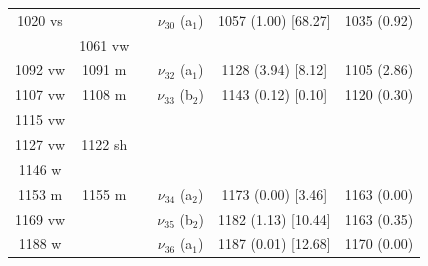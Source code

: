 \begin{table}[H]
\begin{center}
\begin{tabular}{c c c c c c}
 1020 vs &  &  & $\nu_{30}$ (a$_{1}$) & 1057 (1.00) [68.27] & 1035 (0.92) \\ 
 & 1061 vw &  &  &  &  \\ 
 1092 vw & 1091 m &  & $\nu_{32}$ (a$_{1}$)
 & 1128 (3.94) [8.12] & 1105 (2.86) \\ 
 1107 vw  & 1108 m &  & $\nu_{33}$ (b$_{2}$) & 1143 (0.12) [0.10] & 1120 (0.30) \\ 
 1115 vw &  &  &  &  &  \\ 
 1127 vw & 1122 sh &  &  &  & \multicolumn{1}{l}{} \\ 
 1146 w &  &  &  & \multicolumn{1}{l}{} &  \\ 
 1153 m & 1155 m &  & $\nu_{34}$ (a$_{2}$) & 1173 (0.00) [3.46] & 1163 (0.00) \\ 
 	1169 vw &  & \multicolumn{1}{l}{} & $\nu_{35}$ (b$_{2}$) & \multicolumn{1}{l}{1182 (1.13) [10.44]} & 1163 (0.35) \\ 
 	1188 w &  & \multicolumn{1}{l}{} & $\nu_{36}$ (a$_{1}$) & \multicolumn{1}{l}{1187 (0.01) [12.68]} & 1170 (0.00) \\ 
  \bottomrule
\end{tabular}
\end{center}
\end{table}
 
 
 
